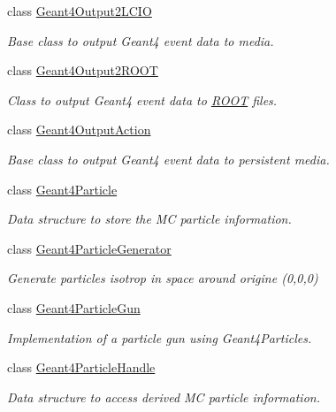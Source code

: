 \begin{DoxyCompactItemize}
\item 
class \hyperlink{class_d_d4hep_1_1_simulation_1_1_geant4_output2_l_c_i_o}{Geant4\+Output2\+L\+C\+IO}
\begin{DoxyCompactList}\small\item\em Base class to output Geant4 event data to media. \end{DoxyCompactList}\item 
class \hyperlink{class_d_d4hep_1_1_simulation_1_1_geant4_output2_r_o_o_t}{Geant4\+Output2\+R\+O\+OT}
\begin{DoxyCompactList}\small\item\em Class to output Geant4 event data to \hyperlink{namespace_r_o_o_t}{R\+O\+OT} files. \end{DoxyCompactList}\item 
class \hyperlink{class_d_d4hep_1_1_simulation_1_1_geant4_output_action}{Geant4\+Output\+Action}
\begin{DoxyCompactList}\small\item\em Base class to output Geant4 event data to persistent media. \end{DoxyCompactList}\item 
class \hyperlink{class_d_d4hep_1_1_simulation_1_1_geant4_particle}{Geant4\+Particle}
\begin{DoxyCompactList}\small\item\em Data structure to store the MC particle information. \end{DoxyCompactList}\item 
class \hyperlink{class_d_d4hep_1_1_simulation_1_1_geant4_particle_generator}{Geant4\+Particle\+Generator}
\begin{DoxyCompactList}\small\item\em Generate particles isotrop in space around origine (0,0,0) \end{DoxyCompactList}\item 
class \hyperlink{class_d_d4hep_1_1_simulation_1_1_geant4_particle_gun}{Geant4\+Particle\+Gun}
\begin{DoxyCompactList}\small\item\em Implementation of a particle gun using Geant4\+Particles. \end{DoxyCompactList}\item 
class \hyperlink{class_d_d4hep_1_1_simulation_1_1_geant4_particle_handle}{Geant4\+Particle\+Handle}
\begin{DoxyCompactList}\small\item\em Data structure to access derived MC particle information. \end{DoxyCompactList}\item 

\end{DoxyCompactItemize}
